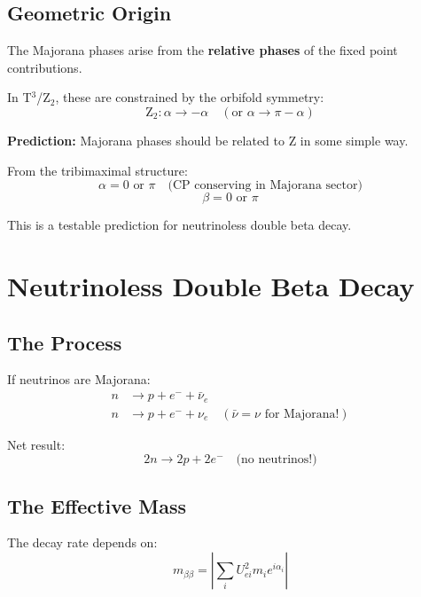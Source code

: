 \documentclass[12pt,a4paper]{article}
\begin{document}
\subsection{Geometric Origin}

The Majorana phases arise from the \textbf{relative phases} of the fixed point contributions.

In T$^3$/Z$_2$, these are constrained by the orbifold symmetry:
\begin{equation}
\text{Z}_2: \alpha \rightarrow -\alpha \quad (\text{or } \alpha \rightarrow \pi - \alpha)
\end{equation}

\textbf{Prediction:} Majorana phases should be related to Z in some simple way.

From the tribimaximal structure:
\begin{equation}
\alpha = 0 \text{ or } \pi \quad \text{(CP conserving in Majorana sector)}
\end{equation}
\begin{equation}
\beta = 0 \text{ or } \pi
\end{equation}

This is a testable prediction for neutrinoless double beta decay.

\section{Neutrinoless Double Beta Decay}

\subsection{The Process}

If neutrinos are Majorana:
\begin{align}
n &\rightarrow p + e^- + \bar{\nu}_e \\
n &\rightarrow p + e^- + \nu_e \quad (\bar{\nu} = \nu \text{ for Majorana!})
\end{align}

Net result:
\begin{equation}
2n \rightarrow 2p + 2e^- \quad \text{(no neutrinos!)}
\end{equation}

\subsection{The Effective Mass}

The decay rate depends on:
\begin{equation}
m_{\beta\beta} = \left| \sum_i U^2_{ei} m_i e^{i\alpha_i} \right|
\end{equation}
\end{document}
